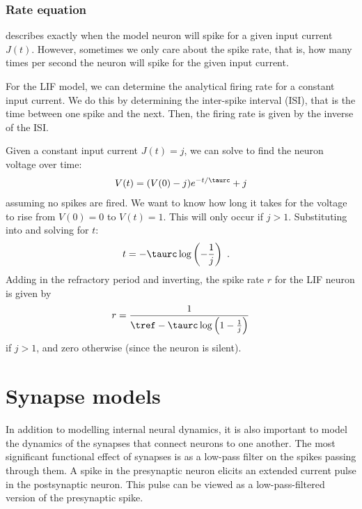 \subsubsection{Rate equation}

 describes exactly when the model neuron will spike
for a given input current $J(t)$.
However, sometimes we only care about the spike rate,
that is, how many times per second the neuron will spike
for the given input current.

For the LIF model, we can determine the analytical firing rate
for a constant input current.
We do this by determining the inter-spike interval (ISI),
that is the time between one spike and the next.
Then, the firing rate is given by the inverse of the ISI.

Given a constant input current $J(t) = j$,
we can solve  to find the neuron voltage over time:
\begin{align}
  V(t) = (V(0) - j) e^{-t / \taurc} + j
  \eqnlabel{lifvoltage}
\end{align}
assuming no spikes are fired.
We want to know how long it takes for the voltage to rise from $V(0) = 0$
to $V(t) = 1$.
This will only occur if $j > 1$.
Substituting into  and solving for $t$:
\begin{align}
  t &= -\taurc \log\left(-\frac{1}{j}\right) \text{ .}
\end{align}
Adding in the refractory period and inverting,
the spike rate $r$ for the LIF neuron is given by
\begin{align}
  r = \frac{1}{\tref - \taurc \log\left(1 - \frac{1}{j}\right)}
  \eqnlabel{lifrate}
\end{align}
if $j > 1$, and zero otherwise (since the neuron is silent).


\section{Synapse models}

In addition to modelling internal neural dynamics,
it is also important to model the dynamics of the synapses
that connect neurons to one another.
The most significant functional effect of synapses is
as a low-pass filter on the spikes passing through them.
A spike in the presynaptic neuron elicits an extended current pulse
in the postsynaptic neuron.
This pulse can be viewed as a low-pass-filtered version
of the presynaptic spike.

